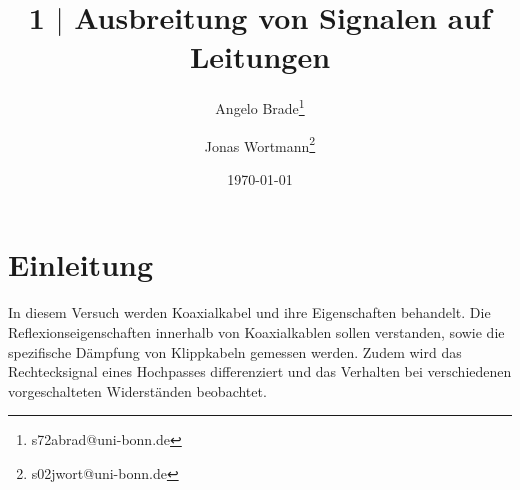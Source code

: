 \documentclass[a4paper,10pt]{article}
\numberwithin{equation}{section}
\begin{document}

\begin{titlepage}
        \title{1 $|$ Ausbreitung von Signalen auf Leitungen}
        \author[1]{Angelo Brade\thanks{s72abrad@uni-bonn.de}}
        \author[1]{Jonas Wortmann\thanks{s02jwort@uni-bonn.de}}
        \date{\today}
\end{titlepage}

\maketitle
{}


\newpage


\fancyhead[R]{\thepage}
\fancyfoot[C]{}

\tableofcontents


\newpage


\fancyhead[L]{\leftmark}

\section{Einleitung}
In diesem Versuch werden Koaxialkabel und ihre Eigenschaften behandelt.
Die Reflexionseigenschaften innerhalb von Koaxialkablen sollen verstanden, sowie die spezifische Dämpfung von Klippkabeln gemessen werden.
Zudem wird das Rechtecksignal eines Hochpasses differenziert und das Verhalten bei verschiedenen vorgeschalteten Widerständen beobachtet.

\newpage
\end{document}
